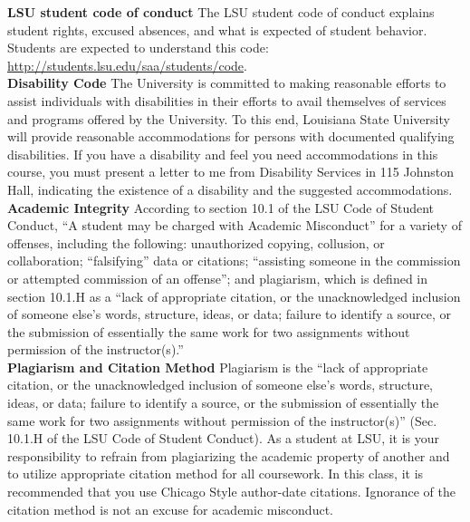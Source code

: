\documentclass[11pt,article,oneside]{memoir}
\begin{document}
\noindent \textbf{LSU student code of conduct}
The LSU student code of conduct explains student rights, excused absences, and what is expected of student behavior. Students are expected to understand this code:  \url{http://students.lsu.edu/saa/students/code}.\\ %

\noindent \textbf{Disability Code}
The University is committed to making reasonable efforts to assist individuals with disabilities in
their efforts to avail themselves of services and programs offered by the University. To this end,
Louisiana State University will provide reasonable accommodations for persons with
documented qualifying disabilities. If you have a disability and feel you need accommodations in
this course, you must present a letter to me from Disability Services in 115 Johnston Hall,
indicating the existence of a disability and the suggested accommodations.\\

\noindent \textbf{Academic Integrity}
According to section 10.1 of the LSU Code of Student Conduct, ``A student may be charged with Academic Misconduct'' for a variety of offenses, including the following: unauthorized copying, collusion, or collaboration; ``falsifying'' data or citations; ``assisting someone in the commission or attempted commission of an offense''; and plagiarism, which is defined in section 10.1.H as a ``lack of appropriate citation, or the unacknowledged inclusion of someone else's words, structure, ideas, or data; failure to identify a source, or the submission of essentially the same work for two assignments without permission of the instructor(s).''\\

\noindent \textbf{Plagiarism and Citation Method}
Plagiarism is the ``lack of appropriate citation, or the unacknowledged inclusion of someone else's words, structure, ideas, or data; failure to identify a source, or the submission of essentially the same work for two assignments without permission of the instructor(s)'' (Sec. 10.1.H of the LSU Code of Student Conduct). As a student at LSU, it is your responsibility to refrain from plagiarizing the academic property of another and to utilize appropriate citation method for all coursework. In this class, it is recommended that you use Chicago Style author-date citations. Ignorance of the citation method is not an excuse for academic misconduct.
\end{document}
